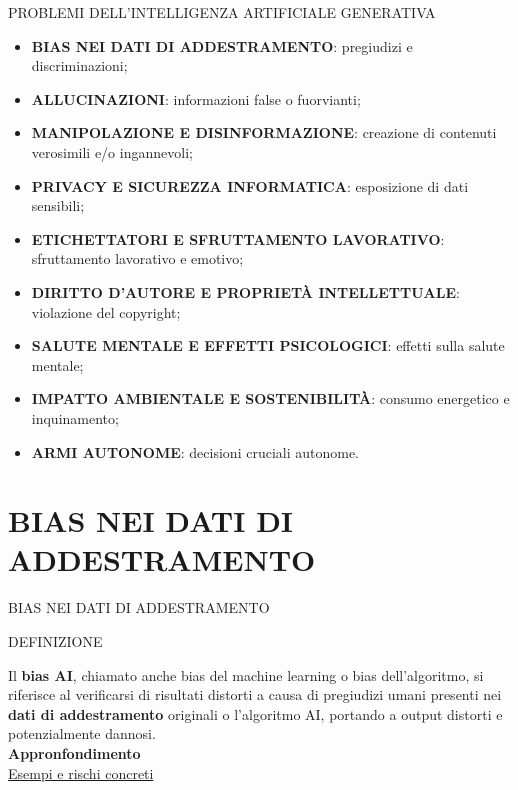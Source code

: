 \documentclass[aspectratio=1610]{beamer}
\begin{document}
\begin{frame}{PROBLEMI DELL'INTELLIGENZA ARTIFICIALE GENERATIVA}
    \begin{itemize}
        \item \textbf{BIAS NEI DATI DI ADDESTRAMENTO}: pregiudizi e discriminazioni;
        \pause
        \item \textbf{ALLUCINAZIONI}: informazioni false o fuorvianti;
        \pause
        \item \textbf{MANIPOLAZIONE E DISINFORMAZIONE}: creazione di contenuti verosimili e/o ingannevoli;
        \pause
        \item \textbf{PRIVACY E SICUREZZA INFORMATICA}: esposizione di dati sensibili;
        \pause
        \item \textbf{ETICHETTATORI E SFRUTTAMENTO LAVORATIVO}: sfruttamento lavorativo e emotivo;
        \pause
        \item \textbf{DIRITTO D'AUTORE E PROPRIETÀ INTELLETTUALE}: violazione del copyright;
        \pause
        \item \textbf{SALUTE MENTALE E EFFETTI PSICOLOGICI}: effetti sulla salute mentale;
        \pause
        \item \textbf{IMPATTO AMBIENTALE E SOSTENIBILITÀ}: consumo energetico e inquinamento;
        \pause
        \item \textbf{ARMI AUTONOME}: decisioni cruciali autonome.
    \end{itemize}
\end{frame}

\section{BIAS NEI DATI DI ADDESTRAMENTO}

\begin{frame}{BIAS NEI DATI DI ADDESTRAMENTO}
    \begin{alertblock}{DEFINIZIONE}
        \begin{minipage}{0.96\linewidth}
            \justifying
            Il \textbf{bias AI}, chiamato anche bias del machine learning o bias dell'algoritmo, 
            si riferisce al verificarsi di risultati distorti a causa di pregiudizi 
            umani presenti nei \textbf{dati di addestramento} originali o l'algoritmo AI, portando 
            a output distorti e potenzialmente dannosi.\\
            
            \bigskip
            \tiny{\textbf{Appronfondimento}}\\
            \tiny{\href{https://www.ibm.com/it-it/think/topics/ai-bias}{Esempi e rischi concreti}}
        \end{minipage}
    \end{alertblock}
\end{frame}
\end{document}
